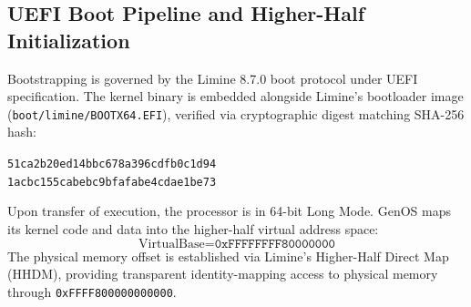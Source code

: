 \documentclass[10pt,journal,compsoc]{IEEEtran}
\theoremstyle{definition}
\begin{document}
\subsection{UEFI Boot Pipeline and Higher-Half Initialization}
Bootstrapping is governed by the Limine 8.7.0 boot protocol under UEFI specification. The kernel binary is embedded alongside Limine's bootloader image (\texttt{boot/\allowbreak limine/\allowbreak BOOTX64.EFI}), verified via cryptographic digest matching SHA-256 hash:
\begin{center}
\scriptsize\texttt{51ca2b20ed14bbc678a396cdfb0c1d94\\1acbc155cabebc9bfafabe4cdae1be73}
\end{center}

Upon transfer of execution, the processor is in 64-bit Long Mode. GenOS maps its kernel code and data into the higher-half virtual address space:
$$\text{VirtualBase} = \texttt{0xFFFFFFFF80000000}$$
The physical memory offset is established via Limine's Higher-Half Direct Map (HHDM), providing transparent identity-mapping access to physical memory through \texttt{0xFFFF800000000000}.
\end{document}

